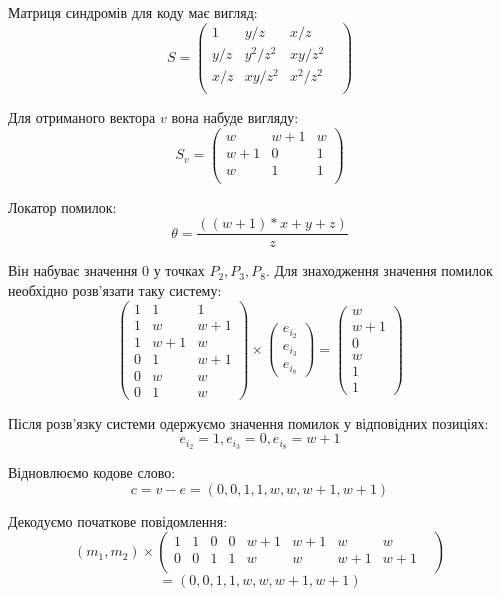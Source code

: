 \documentclass[a4paper,12pt,oneside]{article}
\begin{document}
Матриця синдромів для коду має вигляд:
$$
S =
\begin{pmatrix}
    1 &  y/z &  x/z &  \\
    y/z &  y^2/z^2 &  xy/z^2 &  \\
    x/z &  xy/z^2 &  x^2/z^2 &  \\
\end{pmatrix}
$$

Для отриманого вектора $v$ вона набуде вигляду:
$$
S_v =
\begin{pmatrix}
    w & w +1 & w \\
    w + 1 & 0 & 1 \\
    w & 1 & 1 \\
\end{pmatrix}
$$

Локатор помилок:
$$
\theta = \frac{(( w + 1)*x + y + z)}{z}
$$

Він набуває значення $0$ у точках $P_2, P_3, P_8$. Для знаходження значення помилок необхідно розв'язати таку систему:
$$
\begin{pmatrix}
    1 & 1 & 1 \\
    1 & w & w + 1 \\
    1 & w + 1 & w \\
    0 & 1 & w + 1 \\
    0 & w & w \\
    0 & 1 & w 
\end{pmatrix} \times 
\begin{pmatrix}
    e_{i_2} \\
    e_{i_3} \\
    e_{i_8}
\end{pmatrix} = 
\begin{pmatrix}
    w \\
    w+1\\
    0\\
    w\\
    1\\
    1
\end{pmatrix}
$$

Після розв'язку системи одержуємо значення помилок у відповідних позиціях:
$$
e_{i_2} = 1, e_{i_3} = 0, e_{i_8} = w+1
$$

Відновлюємо кодове слово:
$$ c=v-e=(0, 0, 1, 1, w, w, w + 1, w + 1)$$

Декодуємо початкове повідомлення:
$$
(m_1, m_2)
\times
\begin{pmatrix}
    1 & 1 & 0 & 0 & w + 1 & w + 1 & w & w & \\
    0 & 0 & 1 & 1 & w & w & w + 1 & w + 1 & \\
\end{pmatrix}
$$
$$
= (0, 0, 1, 1, w, w, w + 1, w + 1)
$$
\end{document}
